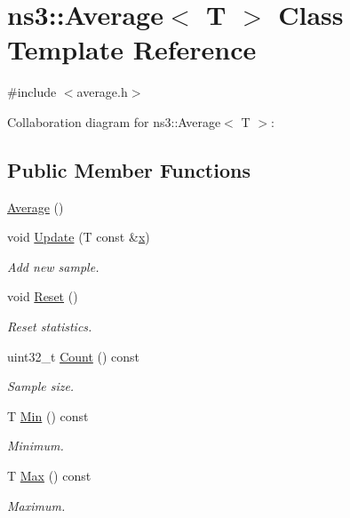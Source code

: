 \hypertarget{classns3_1_1Average}{}\section{ns3\+:\+:Average$<$ T $>$ Class Template Reference}
\label{classns3_1_1Average}


{\ttfamily \#include $<$average.\+h$>$}



Collaboration diagram for ns3\+:\+:Average$<$ T $>$\+:
\subsection*{Public Member Functions}
\begin{DoxyCompactItemize}
\item 
\hyperlink{classns3_1_1Average_a5679c9988e660e93f88cd7ff4e5be53c}{Average} ()
\item 
void \hyperlink{classns3_1_1Average_a223cb5172985f2cf4944488f4ac1186b}{Update} (T const \&\hyperlink{lte__link__budget__x2__handover__measures_8m_a9336ebf25087d91c818ee6e9ec29f8c1}{x})
\begin{DoxyCompactList}\small\item\em Add new sample. \end{DoxyCompactList}\item 
void \hyperlink{classns3_1_1Average_a5e5e855348e124795df3d66d2b62d7d5}{Reset} ()
\begin{DoxyCompactList}\small\item\em Reset statistics. \end{DoxyCompactList}\item 
uint32\+\_\+t \hyperlink{classns3_1_1Average_abdf7954e5cba2818febdd0588b8e4a20}{Count} () const 
\begin{DoxyCompactList}\small\item\em Sample size. \end{DoxyCompactList}\item 
T \hyperlink{classns3_1_1Average_a4649e7990b939fc55360312ac4ab6828}{Min} () const 
\begin{DoxyCompactList}\small\item\em Minimum. \end{DoxyCompactList}\item 
T \hyperlink{classns3_1_1Average_a259a45edf08a70e46c79c627944ff9af}{Max} () const 
\begin{DoxyCompactList}\small\item\em Maximum. \end{DoxyCompactList}\item 

\end{DoxyCompactItemize}

